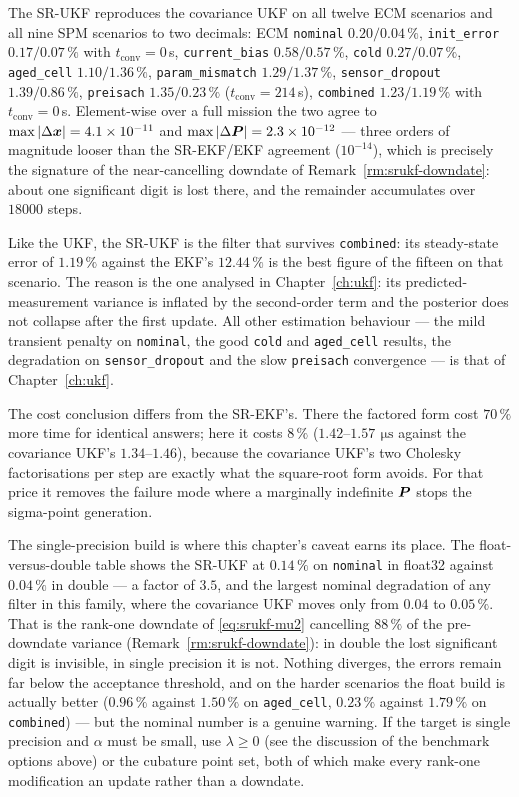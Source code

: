 The SR-UKF reproduces the covariance UKF on all twelve ECM scenarios and all nine SPM scenarios
to two decimals: ECM \texttt{nominal} $0.20/0.04\,\%$, \texttt{init\_error} $0.17/0.07\,\%$
with $t_{\text{conv}} = 0$\,s, \texttt{current\_bias} $0.58/0.57\,\%$, \texttt{cold}
$0.27/0.07\,\%$, \texttt{aged\_cell} $1.10/1.36\,\%$, \texttt{param\_mismatch}
$1.29/1.37\,\%$, \texttt{sensor\_dropout} $1.39/0.86\,\%$, \texttt{preisach} $1.35/0.23\,\%$
($t_{\text{conv}} = 214$\,s), \texttt{combined} $1.23/1.19\,\%$ with $t_{\text{conv}} = 0$\,s.
Element-wise over a full mission the two agree to $\max\left\lvert \Delta\bm{x} \right\rvert = 4.1\times10^{-11}$ and
$\max\left\lvert \Delta\bm{P} \right\rvert = 2.3\times10^{-12}$ --- three orders of magnitude looser than the
SR-EKF/EKF agreement ($10^{-14}$), which is precisely the signature of the near-cancelling
downdate of Remark~\ref{rm:srukf-downdate}: about one significant digit is lost there, and the
remainder accumulates over $\num{18000}$ steps.

Like the UKF, the SR-UKF is the filter that survives \texttt{combined}: its steady-state
error of $1.19\,\%$ against the EKF's $12.44\,\%$ is the best figure of the fifteen on that
scenario. The reason is the one analysed in Chapter~\ref{ch:ukf}: its
predicted-measurement variance is inflated by the second-order term and the posterior does not
collapse after the first update. All other estimation behaviour --- the mild transient penalty
on \texttt{nominal}, the good \texttt{cold} and \texttt{aged\_cell} results, the degradation on
\texttt{sensor\_dropout} and the slow \texttt{preisach} convergence --- is that of
Chapter~\ref{ch:ukf}.

The cost conclusion differs from the SR-EKF's. There the factored form cost $70\,\%$ more time
for identical answers; here it costs $8\,\%$ ($1.42$--$1.57\,\SI{}{\micro\second}$ against the
covariance UKF's $1.34$--$1.46$), because the covariance UKF's two Cholesky factorisations per
step are exactly what the square-root form avoids. For that price it removes the failure mode
where a marginally indefinite $\bm{P}$ stops the sigma-point generation.

The single-precision build is where this chapter's caveat earns its place. The
float-versus-double table shows the SR-UKF at $0.14\,\%$ on \texttt{nominal} in float32 against
$0.04\,\%$ in double --- a factor of $3.5$, and the largest nominal degradation of any filter in
this family, where the covariance UKF moves only from $0.04$ to $0.05\,\%$. That is the
rank-one downdate of \eqref{eq:srukf-mu2} cancelling $88\,\%$ of the pre-downdate variance
(Remark~\ref{rm:srukf-downdate}): in double the lost significant digit is invisible, in single
precision it is not. Nothing diverges, the errors remain far below the acceptance threshold, and
on the harder scenarios the float build is actually better ($0.96\,\%$ against $1.50\,\%$ on
\texttt{aged\_cell}, $0.23\,\%$ against $1.79\,\%$ on \texttt{combined}) --- but the nominal
number is a genuine warning. If the target is single precision and $\alpha$ must be small, use
$\lambda\ge0$ (see the discussion of the benchmark options above) or the cubature point set,
both of which make every rank-one modification an update rather than a downdate.

